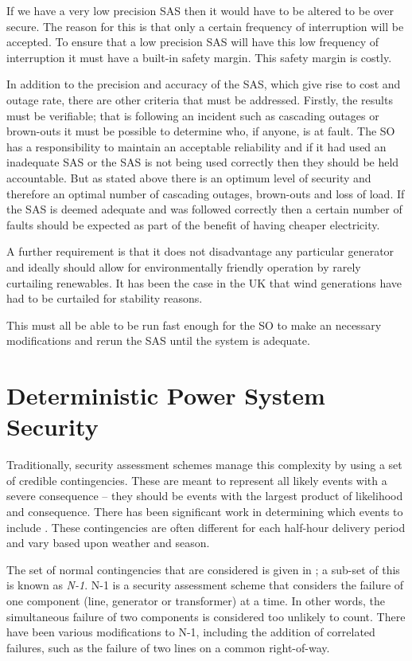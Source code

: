 \documentclass[a4paper,oneside,12pt]{report}
\begin{document}
If we have a very low precision SAS then it would have to be altered to be over secure. The reason for this is that only a certain frequency of interruption will be accepted. To ensure that a low precision SAS will have this low frequency of interruption it must have a built-in safety margin. This safety margin is costly.

In addition to the precision and accuracy of the SAS, which give rise to cost and outage rate, there are other criteria that must be addressed. Firstly, the results must be verifiable; that is following an incident such as cascading outages or brown-outs it must be possible to determine who, if anyone, is at fault. The SO has a responsibility to maintain an acceptable reliability and if it had used an inadequate SAS or the SAS is not being used correctly then they should be held accountable. But as stated above there is an optimum level of security and therefore an optimal number of cascading outages, brown-outs and loss of load. If the SAS is deemed adequate and was followed correctly then a certain number of faults should be expected as part of the benefit of having cheaper electricity.

A further requirement is that it does not disadvantage any particular generator and ideally should allow for environmentally friendly operation by rarely curtailing renewables. It has been the case in the UK that wind generations have had to be curtailed for stability reasons.

This must all be able to be run fast enough for the SO to make an necessary modifications and rerun the SAS until the system is adequate.


\section{Deterministic Power System Security}

Traditionally, security assessment schemes manage this complexity by using a set of credible contingencies. These are meant to represent all likely events with a severe consequence -- they should be events with the largest product of likelihood and consequence. There has been significant work in determining which events to include \cite{Balu1992, McCalley1999, Donde2008}. These contingencies are often different for each half-hour delivery period and vary based upon weather and season.

The set of normal contingencies that are considered is given in \cite{Kundur1994}; a sub-set of this is known as \emph{N-1}. N-1 is a security assessment scheme that considers the failure of one component (line, generator or transformer) at a time. In other words, the simultaneous failure of two components is considered too unlikely to count. There have been various modifications to N-1, including the addition of correlated failures, such as the failure of two lines on a common right-of-way.
\end{document}
